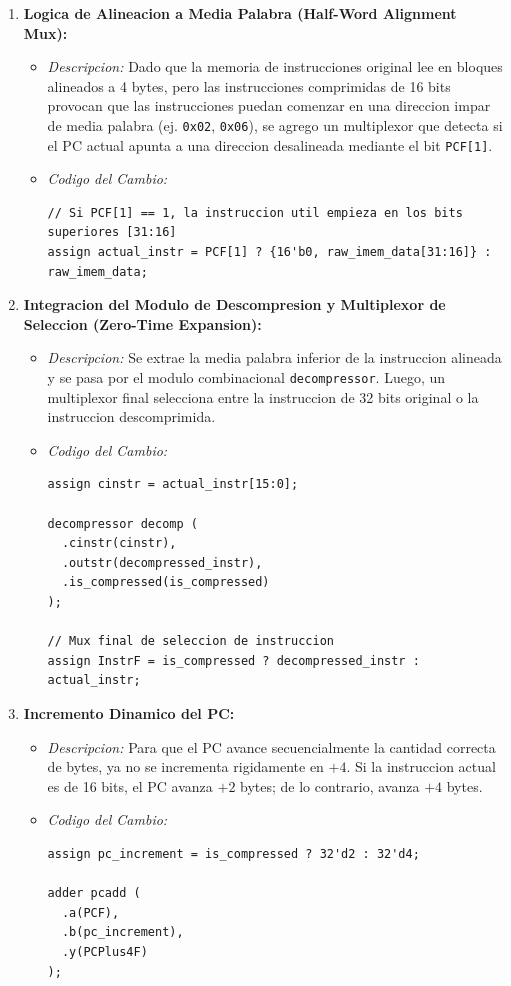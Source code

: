 \documentclass[12pt, a4paper]{article}
\begin{document}
\begin{enumerate}
    \item \textbf{Logica de Alineacion a Media Palabra (Half-Word Alignment Mux):}
    \begin{itemize}
        \item \textit{Descripcion:} Dado que la memoria de instrucciones original lee en bloques alineados a 4 bytes, pero las instrucciones comprimidas de 16 bits provocan que las instrucciones puedan comenzar en una direccion impar de media palabra (ej. \texttt{0x02}, \texttt{0x06}), se agrego un multiplexor que detecta si el PC actual apunta a una direccion desalineada mediante el bit \texttt{PCF[1]}.
        \item \textit{Codigo del Cambio:}
        \begin{lstlisting}[style=verilogstyle]
// Si PCF[1] == 1, la instruccion util empieza en los bits superiores [31:16]
assign actual_instr = PCF[1] ? {16'b0, raw_imem_data[31:16]} : raw_imem_data;
        \end{lstlisting}
    \end{itemize}

    \item \textbf{Integracion del Modulo de Descompresion y Multiplexor de Seleccion (Zero-Time Expansion):}
    \begin{itemize}
        \item \textit{Descripcion:} Se extrae la media palabra inferior de la instruccion alineada y se pasa por el modulo combinacional \texttt{decompressor}. Luego, un multiplexor final selecciona entre la instruccion de 32 bits original o la instruccion descomprimida.
        \item \textit{Codigo del Cambio:}
        \begin{lstlisting}[style=verilogstyle]
assign cinstr = actual_instr[15:0];

decompressor decomp (
  .cinstr(cinstr),
  .outstr(decompressed_instr),
  .is_compressed(is_compressed)
);

// Mux final de seleccion de instruccion
assign InstrF = is_compressed ? decompressed_instr : actual_instr;
        \end{lstlisting}
    \end{itemize}

    \item \textbf{Incremento Dinamico del PC:}
    \begin{itemize}
        \item \textit{Descripcion:} Para que el PC avance secuencialmente la cantidad correcta de bytes, ya no se incrementa rigidamente en $+4$. Si la instruccion actual es de 16 bits, el PC avanza $+2$ bytes; de lo contrario, avanza $+4$ bytes.
        \item \textit{Codigo del Cambio:}
        \begin{lstlisting}[style=verilogstyle]
assign pc_increment = is_compressed ? 32'd2 : 32'd4;

adder pcadd (
  .a(PCF),
  .b(pc_increment),
  .y(PCPlus4F)
);
        \end{lstlisting}
    \end{itemize}
\end{enumerate}
\end{document}
